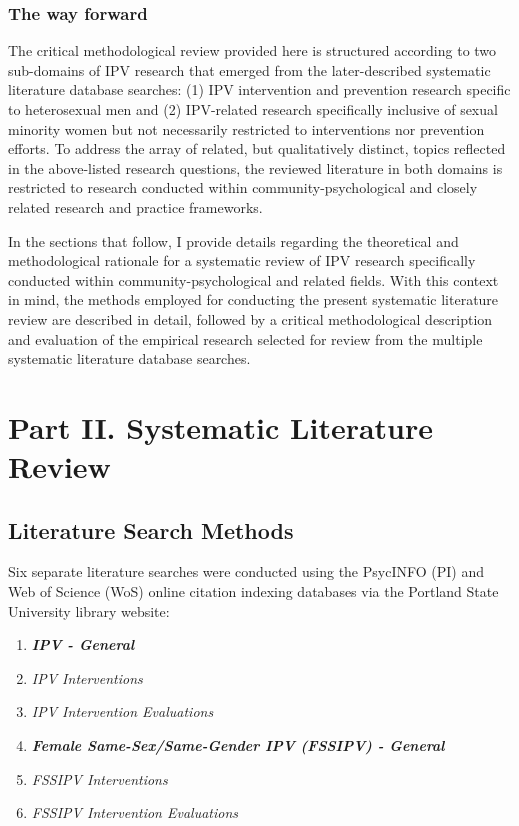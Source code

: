 \documentclass[11pt,]{tufte-book}
\providecommand{\tightlist}{%
  \setlength{\itemsep}{0pt}\setlength{\parskip}{0pt}}
\begin{document}
\section{The way forward}\label{the-way-forward}

The critical methodological review provided here is structured according
to two sub-domains of IPV research that emerged from the later-described
systematic literature database searches: (1) IPV intervention and
prevention research specific to heterosexual men and (2) IPV-related
research specifically inclusive of sexual minority women but not
necessarily restricted to interventions nor prevention efforts. To
address the array of related, but qualitatively distinct, topics
reflected in the above-listed research questions, the reviewed
literature in both domains is restricted to research conducted within
community-psychological and closely related research and practice
frameworks.

In the sections that follow, I provide details regarding the theoretical
and methodological rationale for a systematic review of IPV research
specifically conducted within community-psychological and related
fields. With this context in mind, the methods employed for conducting
the present systematic literature review are described in detail,
followed by a critical methodological description and evaluation of the
empirical research selected for review from the multiple systematic
literature database searches.

\part{Part II. Systematic Literature Review}

\chapter{Literature Search Methods}\label{literature-search-methods}

Six separate literature searches were conducted using the PsycINFO (PI)
and Web of Science (WoS) online citation indexing databases via the
Portland State University library website:

\begin{enumerate}
\def\labelenumi{\arabic{enumi}.}
\tightlist
\item
  \emph{\textbf{IPV - General}}
\item
  \emph{IPV Interventions}
\item
  \emph{IPV Intervention Evaluations}
\item
  \emph{\textbf{Female Same-Sex/Same-Gender IPV (FSSIPV) - General}}
\item
  \emph{FSSIPV Interventions}
\item
  \emph{FSSIPV Intervention Evaluations}
\end{enumerate}
\end{document}
